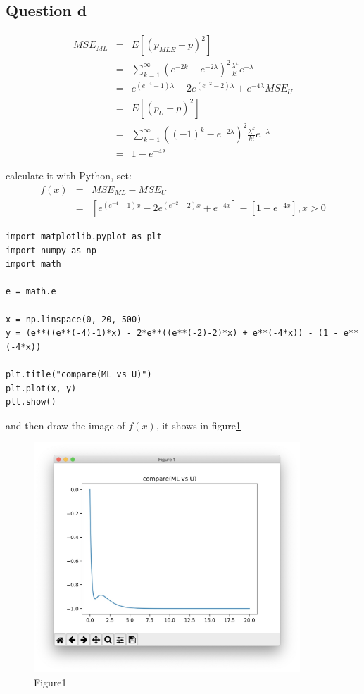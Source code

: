 \documentclass[12pt,letterpaper]{article}
\begin{document}
\subsection*{Question d}

\begin{eqnarray}
MSE_{ML}
&=&E\left[ \left( p_{MLE}-p \right) ^2 \right]\\
&=&\sum_{k=1}^{\infty}{\left( e^{-2k}-e^{-2\lambda} \right)}^2\frac{\lambda ^k}{k!}e^{-\lambda}
\nonumber\\
&=&e^{\left( e^{-4}-1 \right) \lambda}-2e^{\left( e^{-2}-2 \right) \lambda}+e^{-4\lambda}MSE_U
\nonumber\\
&=&E\left[ \left( p_U-p \right) ^2 \right]
\nonumber\\
&=&\sum_{k=1}^{\infty}{\left( \left( -1 \right) ^k-e^{-2\lambda} \right)}^2\frac{\lambda ^k}{k!}e^{-\lambda}
\nonumber\\
&=&1-e^{-4\lambda}\nonumber
\end{eqnarray}

calculate it with Python, set:
\begin{eqnarray}
  f(x)
  &=&MSE_{ML}-MSE_U \\
  &=&[e^{(e^{-4}-1)x}-2e^{(e^{-2}-2)x}+e^{-4x}]-[1-e^{-4x}],x>0 \nonumber
\end{eqnarray}

\begin{lstlisting}[style = Python]
import matplotlib.pyplot as plt
import numpy as np
import math

e = math.e

x = np.linspace(0, 20, 500)
y = (e**((e**(-4)-1)*x) - 2*e**((e**(-2)-2)*x) + e**(-4*x)) - (1 - e**(-4*x))

plt.title("compare(ML vs U)")
plt.plot(x, y)
plt.show()
\end{lstlisting}

and then draw the image of $f(x)$, it shows in figure\ref{fg1}
\begin{figure}
  \centering
  \includegraphics[width=10cm]{001.jpg}
  \caption{Figure1}\label{fg1}
\end{figure}
\end{document}
